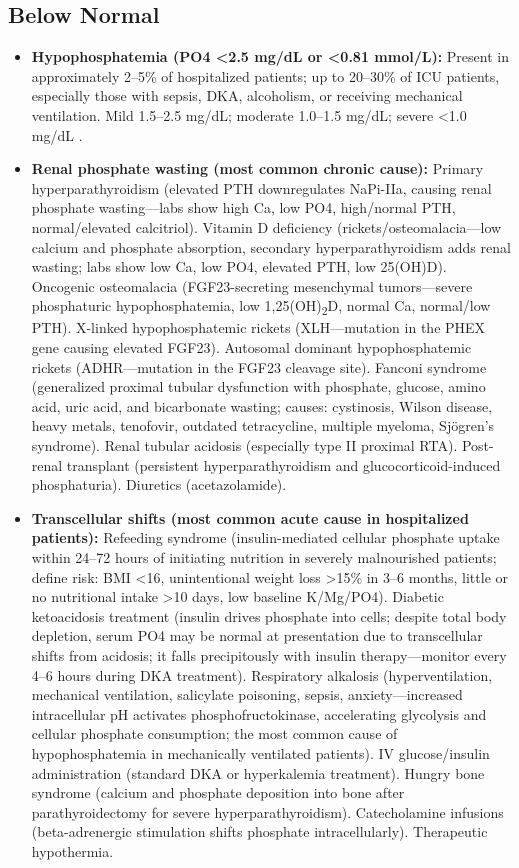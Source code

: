 \subsection*{Below Normal}
\begin{itemize}
  \item \textbf{Hypophosphatemia (PO4 <2.5 mg/dL or <0.81 mmol/L):} Present in approximately 2--5\% of hospitalized patients; up to 20--30\% of ICU patients, especially those with sepsis, DKA, alcoholism, or receiving mechanical ventilation. Mild 1.5--2.5 mg/dL; moderate 1.0--1.5 mg/dL; severe <1.0 mg/dL \cite{amanzadeh2006hypophosphatemia}.
  \item \textbf{Renal phosphate wasting (most common chronic cause):} Primary hyperparathyroidism (elevated PTH downregulates NaPi-IIa, causing renal phosphate wasting---labs show high Ca, low PO4, high/normal PTH, normal/elevated calcitriol). Vitamin D deficiency (rickets/osteomalacia---low calcium and phosphate absorption, secondary hyperparathyroidism adds renal wasting; labs show low Ca, low PO4, elevated PTH, low 25(OH)D). Oncogenic osteomalacia (FGF23-secreting mesenchymal tumors---severe phosphaturic hypophosphatemia, low 1,25(OH)\textsubscript{2}D, normal Ca, normal/low PTH). X-linked hypophosphatemic rickets (XLH---mutation in the PHEX gene causing elevated FGF23). Autosomal dominant hypophosphatemic rickets (ADHR---mutation in the FGF23 cleavage site). Fanconi syndrome (generalized proximal tubular dysfunction with phosphate, glucose, amino acid, uric acid, and bicarbonate wasting; causes: cystinosis, Wilson disease, heavy metals, tenofovir, outdated tetracycline, multiple myeloma, Sj\"{o}gren's syndrome). Renal tubular acidosis (especially type II proximal RTA). Post-renal transplant (persistent hyperparathyroidism and glucocorticoid-induced phosphaturia). Diuretics (acetazolamide).
  \item \textbf{Transcellular shifts (most common acute cause in hospitalized patients):} Refeeding syndrome (insulin-mediated cellular phosphate uptake within 24--72 hours of initiating nutrition in severely malnourished patients; define risk: BMI <16, unintentional weight loss >15\% in 3--6 months, little or no nutritional intake >10 days, low baseline K/Mg/PO4). Diabetic ketoacidosis treatment (insulin drives phosphate into cells; despite total body depletion, serum PO4 may be normal at presentation due to transcellular shifts from acidosis; it falls precipitously with insulin therapy---monitor every 4--6 hours during DKA treatment). Respiratory alkalosis (hyperventilation, mechanical ventilation, salicylate poisoning, sepsis, anxiety---increased intracellular pH activates phosphofructokinase, accelerating glycolysis and cellular phosphate consumption; the most common cause of hypophosphatemia in mechanically ventilated patients). IV glucose/insulin administration (standard DKA or hyperkalemia treatment). Hungry bone syndrome (calcium and phosphate deposition into bone after parathyroidectomy for severe hyperparathyroidism). Catecholamine infusions (beta-adrenergic stimulation shifts phosphate intracellularly). Therapeutic hypothermia.

\end{itemize}
